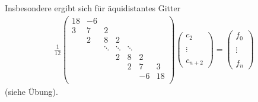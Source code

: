 Insbesondere ergibt sich für äquidistantes Gitter
\begin{gather*}
  \frac{1}{12}
  \left(
    \begin{array}{ccccccc}
      18& -6&&&&&\\
      3&7&2&  &&&\\
        &2&8&2  &&&\\
        & &\ddots &\ddots &\ddots &&\\
        & & & 2&8&2&\\
        & & & &2&7&3\\
        & & &&&-6&18\\
    \end{array}
  \right) 
  \left(
    \begin{array}{c}
      c_2\\ \\ \vdots \\ \\c_{n+2}
    \end{array}\right)
  =
  \left(
    \begin{array}{c}
      f_0\\ \\ \vdots \\ \\f_n
    \end{array}
  \right)
\end{gather*}
(siehe Übung).

